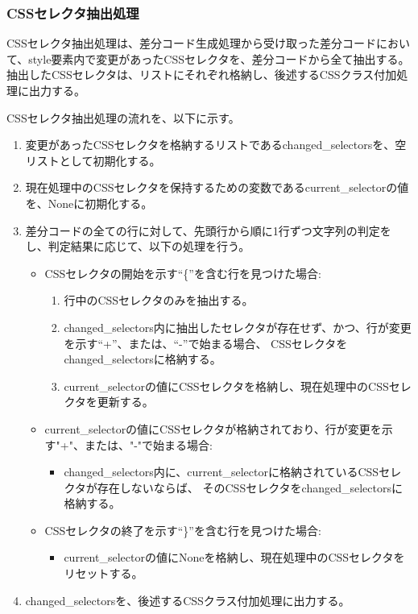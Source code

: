 \subsubsection{CSSセレクタ抽出処理}\label{subsubsec: style_analysis}
CSSセレクタ抽出処理は、差分コード生成処理から受け取った差分コードにおいて、style要素内で変更があったCSSセレクタ\cite{CssSelector}を、差分コードから全て抽出する。
抽出したCSSセレクタは、リストにそれぞれ格納し、後述するCSSクラス付加処理に出力する。
\par
CSSセレクタ抽出処理の流れを、以下に示す。
\begin{enumerate}
    \item 変更があったCSSセレクタを格納するリストであるchanged\_selectorsを、空リストとして初期化する。
    \item 現在処理中のCSSセレクタを保持するための変数であるcurrent\_selectorの値を、Noneに初期化する。
    \item 差分コードの全ての行に対して、先頭行から順に1行ずつ文字列の判定をし、判定結果に応じて、以下の処理を行う。
          \begin{itemize}
              \item CSSセレクタの開始を示す“\{”を含む行を見つけた場合:
                    \begin{enumerate}
                        \item 行中のCSSセレクタのみを抽出する。
                        \item changed\_selectors内に抽出したセレクタが存在せず、かつ、行が変更を示す“+”、または、“-”で始まる場合、
                              CSSセレクタをchanged\_selectorsに格納する。
                        \item current\_selectorの値にCSSセレクタを格納し、現在処理中のCSSセレクタを更新する。
                    \end{enumerate}
              \item current\_selectorの値にCSSセレクタが格納されており、行が変更を示す"+"、または、"-"で始まる場合:
                    \begin{itemize}
                        \item changed\_selectors内に、current\_selectorに格納されているCSSセレクタが存在しないならば、
                              そのCSSセレクタをchanged\_selectorsに格納する。
                    \end{itemize}
              \item CSSセレクタの終了を示す“\}”を含む行を見つけた場合:
                    \begin{itemize}
                        \item current\_selectorの値にNoneを格納し、現在処理中のCSSセレクタをリセットする。
                    \end{itemize}
          \end{itemize}
    \item changed\_selectorsを、後述するCSSクラス付加処理に出力する。
\end{enumerate}

